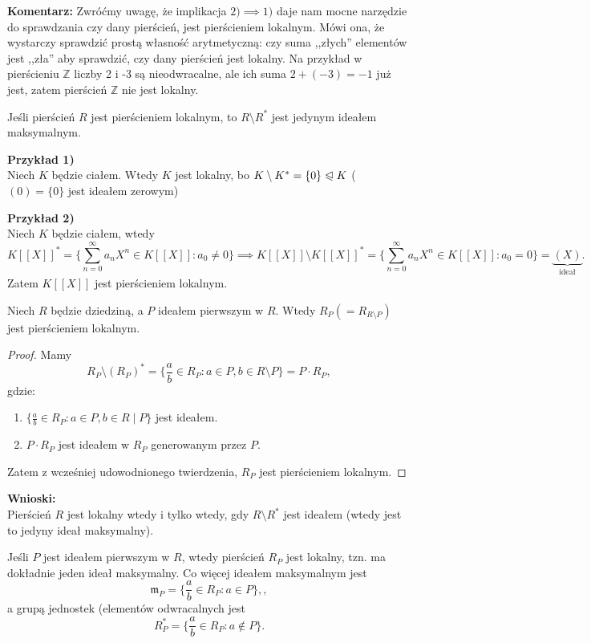 \noindent \textbf{Komentarz:} Zwróćmy uwagę, że implikacja $2) \implies 1)$ daje nam mocne narzędzie do sprawdzania czy dany pierścień, jest pierścieniem lokalnym. Mówi ona, że wystarczy sprawdzić prostą własność arytmetyczną: czy suma ,,złych'' elementów jest ,,zła'' aby sprawdzić, czy dany pierścień jest lokalny. Na przykład w pierścieniu  $\mathbb{Z}$ liczby 2 i -3 są nieodwracalne, ale ich suma $2 + \left( -3 \right) = -1$ już jest, zatem pierścień $\mathbb{Z}$ nie jest lokalny.

\begin{corollary}

	Jeśli pierścień $R$ jest pierścieniem lokalnym, to $R\setminus R^{\ast} $ jest jedynym ideałem maksymalnym.
\end{corollary}
\noindent \textbf{Przykład 1)}\\
Niech $K$ będzie ciałem. Wtedy $K$ jest lokalny, bo $K\setminus K^{\ast} = \{0\} \trianglelefteqslant K$ ($\left( 0 \right) = \{0\} $ jest ideałem zerowym)

\noindent \textbf{Przykład 2)} \\
Niech $K$ będzie ciałem, wtedy 
\[
K\left[ \left[ X \right]  \right]^{\ast} = \{\sum_{n=0}^{\infty} a_{n} X^{n}\in K\left[ \left[ X \right]  \right] : a_0 \neq 0\} \implies K\left[ \left[ X \right]  \right] \setminus K\left[ \left[ X \right]  \right]^{\ast} = \{\sum_{n=0}^{\infty} a_{n} X^{n}\in K\left[ \left[ X \right]  \right]: a_0=0\} = \underbrace{ \left( X \right)  }_{\text{ideał}}
.\] 
Zatem $K\left[ \left[ X \right]  \right] $ jest pierścieniem lokalnym.

\begin{theorem}
	Niech $R$ będzie dziedziną, a $P$ ideałem pierwszym w $R$. Wtedy $R_{P}(=R_{R\setminus P})$ jest pierścieniem lokalnym.
\end{theorem} 
\begin{proof}
	Mamy
	\[
	R_{P}\setminus \left( R_{P} \right)^{\ast} = \{\frac{a}{b}\in R_{P}: a \in P, b \in R\setminus P\} = P \cdot R_{P} 
	,\] 
	gdzie:
	\begin{enumerate}[label=\arabic*)]
		\item $ \{\frac{a}{b}\in R_{P}: a \in P, b \in R\mid P\} $ jest ideałem.
		\item $P\cdot R_{P}$ jest ideałem w $R_{P}$ generowanym przez $P$.
	\end{enumerate}
	Zatem z wcześniej udowodnionego twierdzenia, $R_{P}$ jest pierścieniem lokalnym.
\end{proof} 



\noindent \textbf{Wnioski:} \\
	Pierścień $R$ jest lokalny wtedy i tylko wtedy, gdy $R\setminus R^{\ast} $ jest ideałem (wtedy jest to jedyny ideał maksymalny).

	Jeśli $P$ jest ideałem pierwszym w $R$, wtedy pierścień $R_{P}$ jest lokalny, tzn. ma dokładnie jeden ideał maksymalny. Co więcej ideałem maksymalnym jest
	\[
		\mathfrak{m}_{P} = \{ \frac{a}{b} \in R_{P}: a \in P \},
        ,\]
	a grupą jednostek (elementów odwracalnych jest 
	 \[
	R_{P}^{\ast} = \{\frac{a}{b} \in R_{P} : a \not\in P\} 
	.\] 

